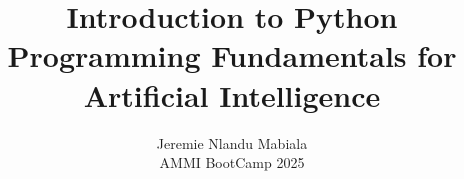 \author[Jeremie N. Mabiala]{Jeremie Nlandu Mabiala \\
AMMI BootCamp 2025}
\title{Introduction to Python \\
\vspace*{.8cm}
Programming Fundamentals for Artificial Intelligence}

